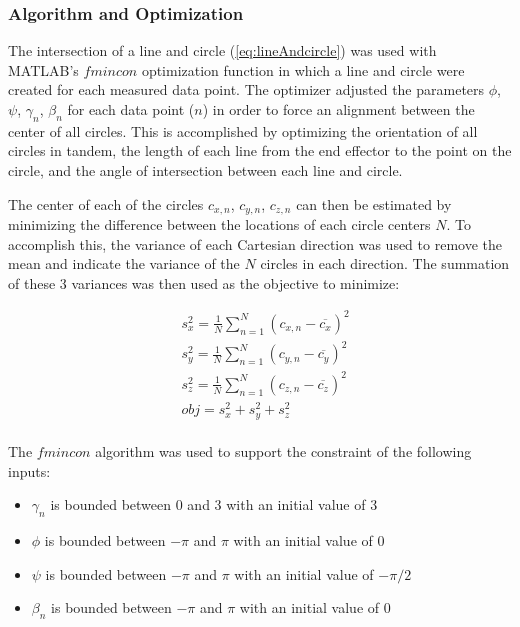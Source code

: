 \documentclass[12pt]{article}
\begin{document}
\subsubsection{Algorithm and Optimization}

The intersection of a line and circle (\ref{eq:lineAndcircle}) was used with MATLAB's $fmincon$ optimization function in which a line and circle were created for each measured data point. The optimizer adjusted the parameters $\phi$, $\psi$, $\gamma_n$, $\beta_n$ for each data point ($n$) in order to force an alignment between the center of all circles. This is accomplished  by optimizing the orientation of all circles in tandem, the length of each line from the end effector to the point on the circle, and the angle of intersection between each line and circle.   

The center of each of the circles $c_{x,n}$, $c_{y,n}$, $c_{z,n}$ can then be estimated by minimizing the difference between the locations of each circle centers $N$.  To accomplish this, the variance of each Cartesian direction was used to remove the mean and indicate the variance of the $N$ circles in each direction.  The summation of these 3 variances was then used as the objective to minimize:


\begin{equation}
  \begin{split}
          & s_x^2 = \frac{1}{N} \sum_{n=1}^{N} (c_{x,n}-\overline{c_x})^2 \\ 
          & s_y^2 = \frac{1}{N} \sum_{n=1}^{N} (c_{y,n}-\overline{c_y})^2 \\ 
          & s_z^2 = \frac{1}{N} \sum_{n=1}^{N} (c_{z,n}-\overline{c_z})^2 \\ 
          &obj = s_x^2 + s_y^2 +s_z^2
  \label{eq:param_obj}
  \end{split}
\end{equation}
\\
The $fmincon$ algorithm was used to support the constraint of the following inputs:

\begin{itemize}
\item $\gamma_n$ is bounded between 0 and 3 with an initial value of 3
\item $\phi$ is bounded between $-\pi$ and $\pi$ with an initial value of 0
\item $\psi$ is bounded between $-\pi$ and $\pi$ with an initial value of $-\pi/2$
\item $\beta_n$ is bounded between $-\pi$ and $\pi$ with an initial value of 0 
\end{itemize}
\end{document}
